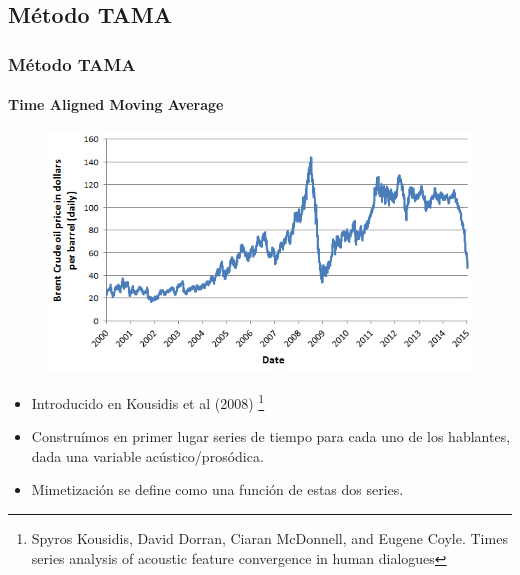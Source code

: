 \subsection{Método TAMA}




\begin{frame}
  \frametitle{Método TAMA}
  \framesubtitle{Time Aligned Moving Average}

  \begin{figure}[t]
    \includegraphics[scale=0.30]{images/oil_price.jpg}
  \end{figure}

  \begin{itemize}
    \item Introducido en Kousidis et al (2008) \footnote{\tiny{Spyros Kousidis, David Dorran, Ciaran McDonnell, and Eugene Coyle. Times series analysis of acoustic feature convergence in human dialogues}}
    \item Construímos en primer lugar series de tiempo para cada uno de los hablantes, dada una variable acústico/prosódica.
    \item Mimetización se define como una función de estas dos series.
  \end{itemize}
\end{frame}



